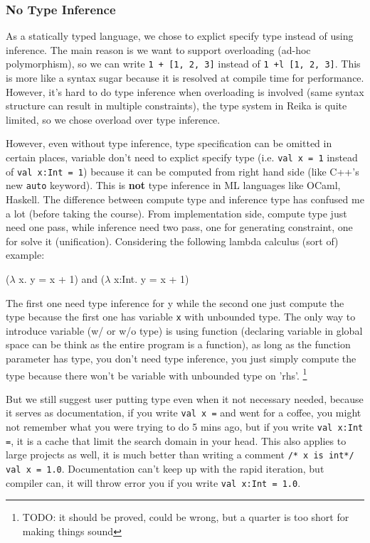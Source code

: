 \documentclass{article}
\begin{document}
\subsubsection{No Type Inference}
\label{subsubsec:no-type-inference}

As a statically typed language, we chose to explict specify type instead of using inference.
The main reason is we want to support overloading (ad-hoc polymorphism),
so we can write \texttt{1 + [1, 2, 3]} instead of \texttt{1 +l [1, 2, 3]}.
This is more like a syntax sugar because it is resolved at compile time for performance.
However, it's hard to do type inference when overloading is involved (same syntax structure can result in multiple constraints),
the type system in Reika is quite limited, so we chose overload over type inference.

However, even without type inference, type specification can be omitted in certain places,
variable don't need to explict specify type (i.e. \verb+val x = 1+ instead of \verb+val x:Int = 1+)
because it can be computed from right hand side (like C++'s new \verb+auto+ keyword).
This is \textbf{not} type inference in ML languages like OCaml, Haskell.
The difference between compute type and inference type has confused me a lot (before taking the course).
From implementation side, compute type just need one pass, while inference need two pass, one for generating constraint, one for solve it (unification).
Considering the following lambda calculus (sort of) example:

\begin{center}
    ($\lambda$ x. y = x + 1) and ($\lambda$ x:Int. y = x + 1)
\end{center}

The first one need type inference for y while the second one just compute the type
because the first one has variable \verb+x+ with unbounded type.
The only way to introduce variable (w/ or w/o type) is using function (declaring variable in global space can be think
as the entire program is a function), as long as the function parameter has type, you don't need type inference, you just
simply compute the type because there won't be variable with unbounded type on 'rhs'.
\footnote{TODO: it should be proved, could be wrong, but a quarter is too short for making things sound}

But we still suggest user putting type even when it not necessary needed, because it serves as documentation,
if you write \verb+val x =+ and went for a coffee, you might not remember what you were trying to do 5 mins ago,
but if you write \verb+val x:Int =+, it is a cache that limit the search domain in your head.
This also applies to large projects as well, it is much better than writing a comment \verb+/* x is int*/ val x = 1.0+.
Documentation can't keep up with the rapid iteration, but compiler can, it will throw error you if you write \verb+val x:Int = 1.0+.
\end{document}
